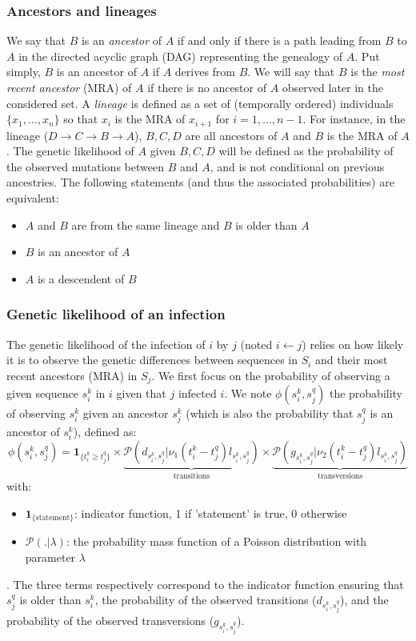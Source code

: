 \documentclass[10pt]{article}
\begin{document}
\subsubsection*{Ancestors and lineages}
\noindent We say that $B$ is an \textit{ancestor} of $A$ if and only if there is a path leading from $B$ to $A$ in the directed acyclic graph (DAG) representing the genealogy of $A$.
Put simply, $B$ is an ancestor of $A$ if $A$ derives from $B$.
We will say that $B$ is the \textit{most recent ancestor} (MRA) of $A$ if there is no ancestor of $A$ observed later in the considered set.
A \textit{lineage} is defined as a set of (temporally ordered) individuals $\{x_1, ..., x_n\}$ so that $x_i$ is the MRA of $x_{i+1}$ for $i=1,\ldots,n-1$.
For instance, in the lineage ($D \rightarrow C \rightarrow B \rightarrow A$), $B,C,D$ are all ancestors of $A$ and $B$ is the MRA of $A$.
The genetic likelihood of $A$ given $B,C,D$ will be defined as the probability of the observed mutations between $B$ and $A$, and is not conditional on previous ancestries.
The following statements (and thus the associated probabilities) are equivalent:
\begin{itemize}
 \item $A$ and $B$ are from the same lineage and $B$ is older than $A$
 \item $B$ is an ancestor of $A$
 \item $A$ is a descendent of $B$
\end{itemize}


\subsubsection*{Genetic likelihood of an infection}
The genetic likelihood of the infection of $i$ by $j$ (noted $i \leftarrow j$) relies on how likely it is to observe the genetic differences between sequences in $S_i$ and their most recent ancestors (MRA) in $S_j$.
We first focus on the probability of observing a given sequence $s_i^k$ in $i$ given that $j$ infected $i$.
We note $\phi(s_i^k, s_j^q)$ the probability of observing $s_i^k$ given an ancestor $s_j^k$ (which is also the probability that $s_j^q$ is an ancestor of $s_i^k$), defined as:
$$
\phi(s_i^k, s_j^q) = \mathbf{1}_{\{t_i^k \geq t_j^q\}} \times 
\underbrace{\mathcal{P}\left(d_{s_i^k,s_j^q} | \nu_1 (t_i^k - t_j^q) l_{s_i^k,s_j^q}\right)}_{\mbox{transitions}}
\times \underbrace{\mathcal{P}\left(g_{s_i^k,s_j^q} | \nu_2 (t_i^k - t_j^q) l_{s_i^k,s_j^q}\right)}_{\mbox{transversions}}
$$
with:
\begin{itemize}
\item $\mathbf{1}_{\{\mbox{statement}\}}$: indicator function, 1 if 'statement' is true, 0 otherwise
\item $\mathcal{P}(.|\lambda)$: the probability mass function of a Poisson distribution with parameter $\lambda$
\end{itemize}
. The three terms respectively correspond to the indicator function ensuring that $s_j^q$ is older than $s_i^k$, the probability of the observed transitions ($d_{s_i^k,s_j^q}$), and the probability of the observed transversions ($g_{s_i^k,s_j^q}$). 
\\
\end{document}
